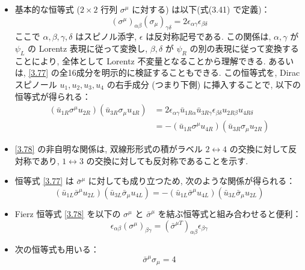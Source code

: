 \documentclass[a4paper,12pt]{article}
\begin{document}
\begin{itemize}
  \item 基本的な恒等式 ($2 \times 2$ 行列 $\sigma^\mu$ に対する) は以下(式(3.41) で定義)：
  \begin{equation*}
    (\sigma^\mu)_{\alpha\beta} (\sigma_\mu)_{\gamma\delta} = 2 \epsilon_{\alpha\gamma} \epsilon_{\beta\delta} \label{3.77}\tag{3.77}
  \end{equation*}
  ここで $\alpha, \beta, \gamma, \delta$ はスピノル添字, $\epsilon$ は反対称記号である. この関係は, $\alpha, \gamma$ が $\psi_L$ の Lorentz 表現に従って変換し, $\beta, \delta$ が $\psi_R$ の別の表現に従って変換することにより, 全体として Lorentz 不変量となることから理解できる. あるいは, \eqref{3.77} の全16成分を明示的に検証することもできる. この恒等式を, Dirac スピノール $u_1, u_2, u_3, u_4$ の右手成分 (つまり下側) に挿入することで, 以下の恒等式が得られる：
  \begin{align*}
    (\bar{u}_{1R} \sigma^\mu u_{2R})(\bar{u}_{3R} \sigma_\mu u_{4R}) &=
    2\epsilon_{\alpha\gamma} \bar{u}_{1R\alpha} \bar{u}_{3R\gamma} \epsilon_{\beta\delta} u_{2R\beta} u_{4R\delta}\\
    &= -(\bar{u}_{1R} \sigma^\mu u_{4R})(\bar{u}_{3R} \sigma_\mu u_{2R}) \label{3.78}\tag{3.78}
  \end{align*}
  \item \eqref{3.78} の非自明な関係は, 双線形形式の積がラベル $2 \leftrightarrow 4$ の交換に対して反対称であり, $1 \leftrightarrow 3$ の交換に対しても反対称であることを示す.

  \item 恒等式 \eqref{3.77} は $\bar{\sigma}^\mu$ に対しても成り立つため, 次のような関係が得られる：
  \begin{equation*}
    (\bar{u}_{1L} \bar{\sigma}^\mu u_{2L})(\bar{u}_{3L} \bar{\sigma}_\mu u_{4L}) = -(\bar{u}_{1L} \bar{\sigma}^\mu u_{4L})(\bar{u}_{3L} \bar{\sigma}_\mu u_{2L}) \tag{3.79}
  \end{equation*}

  \item Fierz 恒等式 \eqref{3.78} を以下の $\sigma^\mu$ と $\bar{\sigma}^\mu$ を結ぶ恒等式と組み合わせると便利：
  \begin{equation*}
    \epsilon_{\alpha\beta} (\sigma^\mu)_{\beta\gamma} = (\bar{\sigma}^{\mu T})_{\alpha\beta} \epsilon_{\beta\gamma} \tag{3.80}
  \end{equation*}

  \item 次の恒等式も用いる：
  \begin{equation*}
    \bar{\sigma}^\mu \sigma_\mu = 4 \tag{3.81}
  \end{equation*}


\end{itemize}
\end{document}
